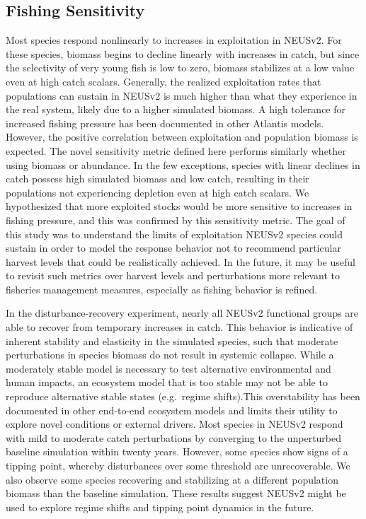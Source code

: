 \documentclass[
]{article}
\begin{document}
\subsection{Fishing Sensitivity}\label{fishing-sensitivity}

Most species respond nonlinearly to increases in exploitation in NEUSv2. For these species, biomass begins to decline linearly with increases in catch, but since the selectivity of very young fish is low to zero, biomass stabilizes at a low value even at high catch scalars. Generally, the realized exploitation rates that populations can sustain in NEUSv2 is much higher than what they experience in the real system, likely due to a higher simulated biomass. A high tolerance for increased fishing pressure has been documented in other Atlantis models. However, the positive correlation between exploitation and population biomass is expected. The novel sensitivity metric defined here performs similarly whether using biomass or abundance. In the few exceptions, species with linear declines in catch possess high simulated biomass and low catch, resulting in their populations not experiencing depletion even at high catch scalars. We hypothesized that more exploited stocks would be more sensitive to increases in fishing pressure, and this was confirmed by this sensitivity metric. The goal of this study was to understand the limits of exploitation NEUSv2 species could sustain in order to model the response behavior not to recommend particular harvest levels that could be realistically achieved. In the future, it may be useful to revisit such metrics over harvest levels and perturbations more relevant to fisheries management measures, especially as fishing behavior is refined.

In the disturbance-recovery experiment, nearly all NEUSv2 functional groups are able to recover from temporary increases in catch. This behavior is indicative of inherent stability and elasticity in the simulated species, such that moderate perturbations in species biomass do not result in systemic collapse. While a moderately stable model is necessary to test alternative environmental and human impacts, an ecosystem model that is too stable may not be able to reproduce alternative stable states (e.g.~regime shifts).This overstability has been documented in other end-to-end ecosystem models and limits their utility to explore novel conditions or external drivers. Most species in NEUSv2 respond with mild to moderate catch perturbations by converging to the unperturbed baseline simulation within twenty years. However, some species show signs of a tipping point, whereby disturbances over some threshold are unrecoverable. We also observe some species recovering and stabilizing at a different population biomass than the baseline simulation. These results suggest NEUSv2 might be used to explore regime shifts and tipping point dynamics in the future.
\end{document}
